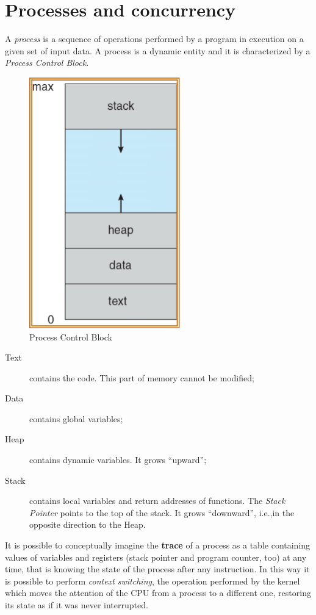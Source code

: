 \chapter{Processes and concurrency}
A \emph{process} is a sequence of operations performed by a program in execution on a given set of input data. A process is a dynamic entity and it is characterized by a \emph{Process Control Block}.

\begin{figure}[hbtp]
\centering
\includegraphics[scale=0.3]{images/processes_concurrency/pcb.jpg}
\caption{Process Control Block}
\end{figure}
\begin{description}
\item [Text] contains the code. This part of memory cannot be modified;
\item [Data] contains global variables;
\item [Heap] contains dynamic variables. It grows ``upward'';
\item [Stack] contains local variables and return addresses of functions. The \emph{Stack Pointer} points to the top of the stack. It grows ``downward'', i.e.,\@ in the opposite direction to the Heap.
\end{description}

It is possible to conceptually imagine the \textbf{trace} of a process as a table containing values of variables and registers (stack pointer and program counter, too) at any time, that is knowing the state of the process after any instruction. In this way it is possible to perform \emph{context switching}, the operation performed by the kernel which moves the attention of the CPU from a process to a different one, restoring its state as if it was never interrupted.

